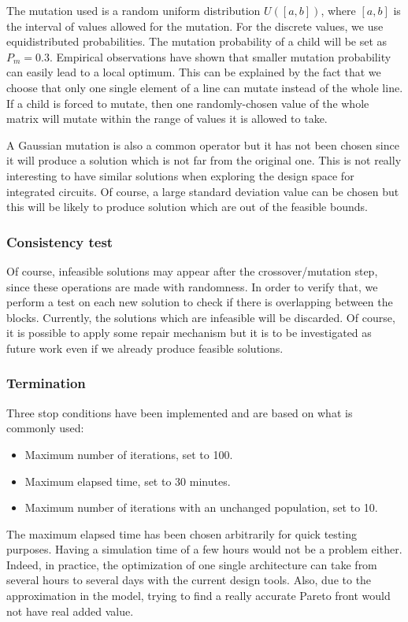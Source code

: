 The mutation used is a random uniform distribution $U([a, b])$, where $[a, b]$ is the interval of values allowed for the mutation. For the discrete values, we use equidistributed probabilities. The mutation probability of a child will be set as $P_{m} = 0.3$. Empirical observations have shown that smaller mutation probability can easily lead to a local optimum. This can be explained by the fact that we choose that only one single element of a line can mutate instead of the whole line. If a child is forced to mutate, then one randomly-chosen value of the whole matrix will mutate within the range of values it is allowed to take.

A Gaussian mutation is also a common operator but it has not been chosen since it will produce a solution which is not far from the original one. This is not really interesting to have similar solutions when exploring the design space for integrated circuits. Of course, a large standard deviation value can be chosen but this will be likely to produce solution which are out of the feasible bounds.

\subsubsection*{Consistency test}
Of course, infeasible solutions may appear after the crossover/mutation step, since these operations are made with randomness. In order to verify that, we perform a test on each new solution to check if there is overlapping between the blocks. Currently, the solutions which are infeasible will be discarded. Of course, it is possible to apply some repair mechanism but it is to be investigated as future work even if we already produce feasible solutions.

\subsubsection*{Termination}
Three stop conditions have been implemented and are based on what is commonly used:
\begin{itemize}
\item Maximum number of iterations, set to 100.
\item Maximum elapsed time, set to 30 minutes.
\item Maximum number of iterations with an unchanged population, set to 10.
\end{itemize}
The maximum elapsed time has been chosen arbitrarily for quick testing purposes. Having a simulation time of a few hours would not be a problem either. Indeed, in practice, the optimization of one single architecture can take from several hours to several days with the current design tools. Also, due to the approximation in the model, trying to find a really accurate Pareto front would not have real added value.

